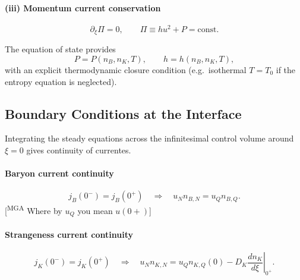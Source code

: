 \documentclass[11pt]{article}
\newcommand{\mgacom}[1]{\textsf{\color[rgb]{0.75,0,0}[\textsuperscript{MGA} #1]}}
\begin{document}
\paragraph{(iii) Momentum current conservation}
\begin{equation}
\partial_\xi \Pi = 0,
\qquad
\Pi \equiv h u^2 + P = \text{const}.
\end{equation}

The equation of state provides
\begin{equation}
P = P(n_B, n_K, T), 
\qquad
h = h(n_B, n_K, T),
\end{equation}
with an explicit thermodynamic closure condition 
(e.g.\ isothermal $T = T_0$ if the entropy equation is neglected).

\subsection{Boundary Conditions at the Interface}

Integrating the steady equations across the infinitesimal control volume 
around $\xi = 0$ gives continuity of currentes.

\paragraph{Baryon current continuity}
\begin{equation}
j_B(0^-) = j_B(0^+)
\quad \Rightarrow \quad
u_N n_{B,N} = u_Q n_{B,Q}.
\end{equation}
\mgacom{Where by $u_Q$ you mean $u(0+)$}

\paragraph{Strangeness current continuity}
\begin{equation}
j_K(0^-) = j_K(0^+)
\quad \Rightarrow \quad
u_N n_{K,N}
=
u_Q n_{K,Q}(0)
-
D_K \left. \frac{d n_K}{d \xi} \right|_{0^+}.
\end{equation}
\end{document}
